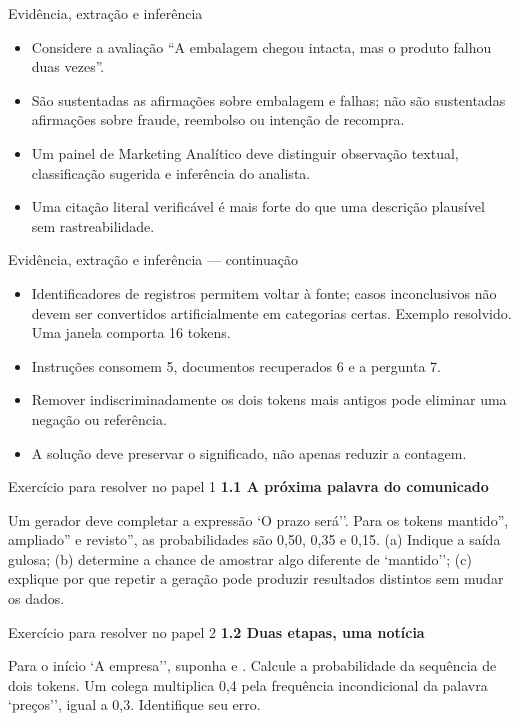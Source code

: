 \documentclass[10pt,aspectratio=169]{beamer}
\begin{document}
\begin{frame}[t]{Evidência, extração e inferência}
\small
\begin{itemize}
\item Considere a avaliação ``A embalagem chegou intacta, mas o produto falhou duas vezes''.
\item São sustentadas as afirmações sobre embalagem e falhas; não são sustentadas afirmações sobre fraude, reembolso ou intenção de recompra.
\item Um painel de Marketing Analítico deve distinguir observação textual, classificação sugerida e inferência do analista.
\item Uma citação literal verificável é mais forte do que uma descrição plausível sem rastreabilidade.
\end{itemize}
\end{frame}

\begin{frame}[t]{Evidência, extração e inferência — continuação}
\small
\begin{itemize}
\item Identificadores de registros permitem voltar à fonte; casos inconclusivos não devem ser convertidos artificialmente em categorias certas. Exemplo resolvido. Uma janela comporta 16 tokens.
\item Instruções consomem 5, documentos recuperados 6 e a pergunta 7.
\item Remover indiscriminadamente os dois tokens mais antigos pode eliminar uma negação ou referência.
\item A solução deve preservar o significado, não apenas reduzir a contagem.
\end{itemize}
\end{frame}

\begin{frame}[t]{Exercício para resolver no papel 1}
\small
\small\textbf{1.1 A próxima palavra do comunicado}\par\vspace{4mm}Um gerador deve completar a expressão `O prazo será''. Para os tokens mantido'', ampliado'' e revisto'', as probabilidades são 0,50, 0,35 e 0,15. (a) Indique a saída gulosa; (b) determine a chance de amostrar algo diferente de `mantido''; (c) explique por que repetir a geração pode produzir resultados distintos sem mudar os dados.
\end{frame}

\begin{frame}[t]{Exercício para resolver no papel 2}
\small
\small\textbf{1.2 Duas etapas, uma notícia}\par\vspace{4mm}Para o início `A empresa'', suponha e . Calcule a probabilidade da sequência de dois tokens. Um colega multiplica 0,4 pela frequência incondicional da palavra `preços'', igual a 0,3. Identifique seu erro.
\end{frame}
\end{document}
